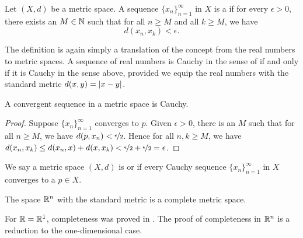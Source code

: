 \begin{defn}
Let $(X,d)$ be a metric space.
A sequence $\{ x_n \}_{n=1}^\infty$ in $X$ is a \emph{} if
for every $\epsilon > 0$, there exists an $M \in {\mathbb{N}}$ such that
for all $n \geq M$ and all $k \geq M$, we have
\begin{equation*}
d(x_n, x_k) < \epsilon .
\end{equation*}
\end{defn}

The definition is again simply a translation of the concept
from the real numbers to metric spaces.  A sequence of real
numbers is Cauchy in the sense of  if and only if
it is Cauchy in the sense above, provided we equip the real numbers with
the standard metric $d(x,y) = \left\lvert {x-y} \right\rvert$.

\begin{prop}
A convergent sequence in a metric space is Cauchy.
\end{prop}

\begin{proof}
Suppose $\{ x_n \}_{n=1}^\infty$ converges to $p$.
Given $\epsilon > 0$, there is an $M$ such that for all $n \geq M$,
we have $d(p,x_n) < \nicefrac{\epsilon}{2}$.  Hence
for all $n,k \geq M$, we have
$d(x_n,x_k) \leq d(x_n,x) + d(x,x_k) < \nicefrac{\epsilon}{2} +
\nicefrac{\epsilon}{2} = \epsilon$.
\end{proof}

\begin{defn}
We say a metric space $(X,d)$ is
\emph{} or \emph{}
if every Cauchy sequence $\{ x_n \}_{n=1}^\infty$ in $X$
converges to a $p \in X$.
\end{defn}

\begin{prop}
The space ${\mathbb{R}}^n$ with the standard metric is a complete metric space.
\end{prop}

For ${\mathbb{R}} = {\mathbb{R}}^1$, completeness was proved in .
The proof of completeness in ${\mathbb{R}}^n$
is a reduction to the one-dimensional case.

